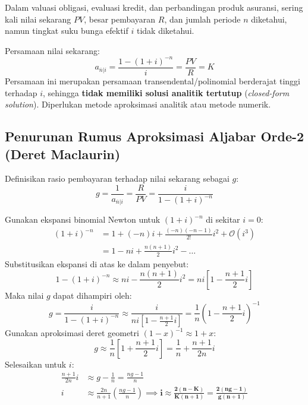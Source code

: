 \documentclass[11pt,a4paper]{article}
\begin{document}
Dalam valuasi obligasi, evaluasi kredit, dan perbandingan produk asuransi, sering kali nilai sekarang $PV$, besar pembayaran $R$, dan jumlah periode $n$ diketahui, namun tingkat suku bunga efektif $i$ tidak diketahui.

Persamaan nilai sekarang:
\begin{equation}
    a_{\overline{n}|i} = \frac{1 - (1+i)^{-n}}{i} = \frac{PV}{R} = K
\end{equation}
Persamaan ini merupakan persamaan transendental/polinomial berderajat tinggi terhadap $i$, sehingga \textbf{tidak memiliki solusi analitik tertutup} (\textit{closed-form solution}). Diperlukan metode aproksimasi analitik atau metode numerik.

\subsection{Penurunan Rumus Aproksimasi Aljabar Orde-2 (Deret Maclaurin)}

Definisikan rasio pembayaran terhadap nilai sekarang sebagai $g$:
\begin{equation}
    g = \frac{1}{a_{\overline{n}|i}} = \frac{R}{PV} = \frac{i}{1 - (1+i)^{-n}}
\end{equation}

Gunakan ekspansi binomial Newton untuk $(1+i)^{-n}$ di sekitar $i = 0$:
\begin{align}
    (1+i)^{-n} &= 1 + (-n)i + \frac{(-n)(-n-1)}{2!} i^2 + \mathcal{O}(i^3) \nonumber\\[0.4em]
               &= 1 - ni + \frac{n(n+1)}{2} i^2 - \dots
\end{align}
Substitusikan ekspansi di atas ke dalam penyebut:
\begin{equation}
    1 - (1+i)^{-n} \approx ni - \frac{n(n+1)}{2} i^2 = ni \left[ 1 - \frac{n+1}{2} i \right]
\end{equation}
Maka nilai $g$ dapat dihampiri oleh:
\begin{equation}
    g = \frac{i}{1 - (1+i)^{-n}} \approx \frac{i}{ni \left[ 1 - \frac{n+1}{2} i \right]} = \frac{1}{n} \left( 1 - \frac{n+1}{2} i \right)^{-1}
\end{equation}
Gunakan aproksimasi deret geometri $(1 - x)^{-1} \approx 1 + x$:
\begin{equation}
    g \approx \frac{1}{n} \left[ 1 + \frac{n+1}{2} i \right] = \frac{1}{n} + \frac{n+1}{2n} i
\end{equation}
Selesaikan untuk $i$:
\begin{align}
    \frac{n+1}{2n} i &\approx g - \frac{1}{n} = \frac{n g - 1}{n} \nonumber\\[0.4em]
    i &\approx \frac{2n}{n+1} \left( \frac{n g - 1}{n} \right) \implies \mathbf{i \approx \frac{2(n - K)}{K(n + 1)} = \frac{2(n g - 1)}{g(n+1)}}
\end{align}
\end{document}
